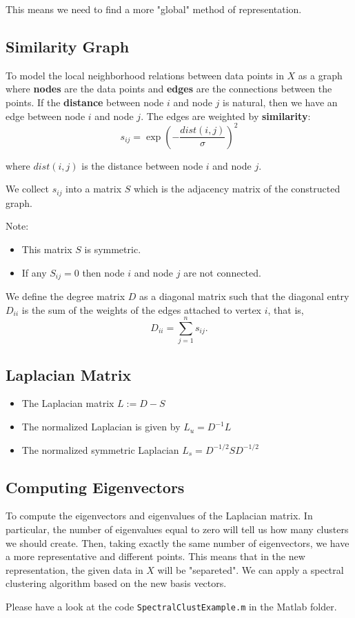This means we need to find a more "global" method of representation.

\subsection{Similarity Graph}

To model the local neighborhood relations between data points in \( X \) as a graph where
\textbf{nodes} are the data points and \textbf{edges} are the connections between the points.
If the \textbf{distance} between node \( i \) and node \( j \) is natural, then we have an 
edge between node \( i \) and node \( j \). The edges are weighted by \textbf{similarity}:
\[ s_{ij} = \exp\left(-\frac{dist(i,j)}{\sigma}\right)^2 \]

where \( dist(i,j) \) is the distance between node \( i \) and node \( j \).

We collect \( s_{ij} \) into a matrix \( S \) which is the adjacency matrix of the constructed graph.
\begin{mdframed}
    Note:
    \begin{itemize}
        \item This matrix \( S \) is symmetric.
        \item If any \( S_{ij} = 0 \) then node \( i \) and node \( j \) are not connected.
    \end{itemize}
\end{mdframed}
    
We define the degree matrix \( D \) as a diagonal matrix such that the diagonal 
entry \( D_{ii} \) is the sum of the weights of the edges attached to vertex \( i \),
that is,
$$ D_{ii} = \sum_{j=1}^{n} s_{ij}. $$

\subsection{Laplacian Matrix}

\begin{itemize}
    \item The Laplacian matrix \( L := D - S \)
    \item The normalized Laplacian is given by $L_{u} = D^{-1} L$
    \item The normalized symmetric Laplacian $ L_s = D^{-1/2} S D^{-1/2}$
\end{itemize}


\subsection{Computing Eigenvectors}

To compute the eigenvectors and eigenvalues of the Laplacian matrix. In particular,
the number of eigenvalues equal to zero will tell us how many clusters we should create.
Then, taking exactly the same number of eigenvectors, we have a more representative and
different points. This means that in the new representation, the given data in \( X \)
will be "separeted". We can apply a spectral clustering algorithm based on the new basis vectors.

Please have a look at the code \texttt{SpectralClustExample.m} in the Matlab folder.
